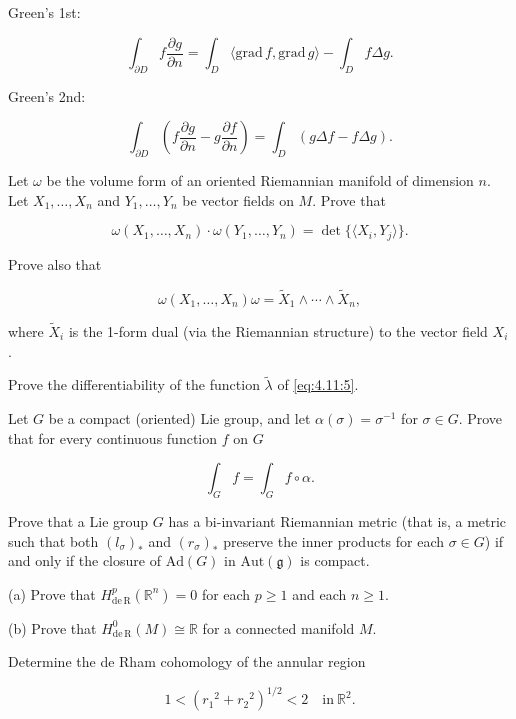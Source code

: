 \begin{problemset}
Green's 1st:

\[
\int_{\partial D}f\frac{\partial g}{\partial n}=\int_{D}\langle\mathrm{grad}\,f,\mathrm{grad}\,g\rangle-\int_{D}f\Delta g.
\]

Green's 2nd:

\[
\int_{\partial D}\left(f\frac{\partial g}{\partial n}-g\frac{\partial f}{\partial n}\right)=\int_{D}(g\Delta f-f\Delta g).
\]

\item Let $\omega$ be the volume form of an oriented Riemannian manifold of dimension $n$. Let $X_{1},\ldots,X_{n}$ and $Y_{1},\ldots,Y_{n}$ be vector fields on $M$. Prove that

\[
\omega(X_{1},\ldots,X_{n})\cdot\omega(Y_{1},\ldots,Y_{n})=\det\{\langle X_{i},Y_{j}\rangle\}.
\]

Prove also that

\[
\omega(X_{1},\ldots,X_{n})\omega=\widetilde{X}_{1}\wedge\cdots\wedge\widetilde{X}_{n},
\]

where  $ \tilde{X}_{i} $ is the 1-form dual (via the Riemannian structure) to the vector field  $ X_{i} $.

\item Prove the differentiability of the function $\tilde{\lambda}$ of \eqref{eq:4.11:5}.

\item Let $G$ be a compact (oriented) Lie group, and let $\alpha(\sigma) = \sigma^{-1}$ for $\sigma \in G$. Prove that for every continuous function $f$ on $G$

\[
\int_{G}f=\int_{G}f\circ\alpha.
\]

\item Prove that a Lie group $G$ has a bi-invariant Riemannian metric (that is, a metric such that both $(l_{\sigma})_{*}$ and $(r_{\sigma})_{*}$ preserve the inner products for each $\sigma\in G$) if and only if the closure of $\mathrm{Ad}(G)$ in $\mathrm{Aut}(\mathfrak{g})$ is compact.

\item (a) Prove that  $ H_{\mathrm{de\,R}}^{p}(\mathbb{R}^{n})=0 $ for each  $ p \geq 1 $ and each  $ n \geq 1 $.

(b) Prove that  $ H_{\mathrm{de\,R}}^{0}(M) \cong \mathbb{R} $ for a connected manifold  $ M $.

\item Determine the de Rham cohomology of the annular region

\[
1<(r_{1}{}^{2}+r_{2}{}^{2})^{1/2}<2\quad\mathrm{in}~\mathbb{R}^{2}.
\]


\end{problemset}
